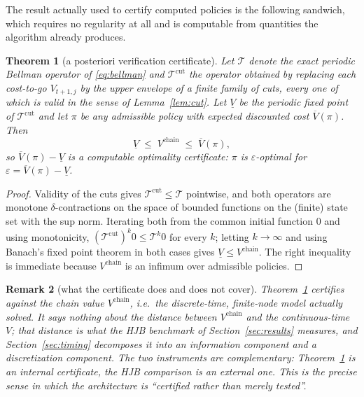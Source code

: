 \documentclass[pdflatex,sn-mathphys-num]{sn-jnl}
\theoremstyle{thmstyleone}
\newtheorem{theorem}{Theorem}[section]
\theoremstyle{thmstyletwo}
\newtheorem{remark}[theorem]{Remark}
\theoremstyle{thmstylethree}
\begin{document}
\begin{appendices}
The result actually used to certify computed policies is the following
sandwich, which requires no regularity at all and is computable from
quantities the algorithm already produces.

\begin{theorem}[a posteriori verification certificate]
\label{thm:posterior}
Let $\mathcal T$ denote the exact periodic Bellman operator of
\eqref{eq:bellman} and $\mathcal T^{\mathrm{cut}}$ the operator obtained by
replacing each cost-to-go $V_{t+1,j}$ by the upper envelope of a finite
family of cuts, every one of which is valid in the sense of
Lemma~\ref{lem:cut}. Let $\underline V$ be the periodic fixed point of
$\mathcal T^{\mathrm{cut}}$ and let $\pi$ be any admissible policy with
expected discounted cost $\overline V(\pi)$. Then
\[
\underline V \;\le\; V^{\mathrm{chain}} \;\le\; \overline V(\pi),
\]
so $\overline V(\pi)-\underline V$ is a computable optimality certificate:
$\pi$ is $\varepsilon$-optimal for $\varepsilon=\overline V(\pi)-\underline V$.
\end{theorem}

\begin{proof}
Validity of the cuts gives $\mathcal T^{\mathrm{cut}}\le\mathcal T$
pointwise, and both operators are monotone $\delta$-contractions on the
space of bounded functions on the (finite) state set with the sup norm.
Iterating both from the common initial function $0$ and using monotonicity,
$(\mathcal T^{\mathrm{cut}})^k 0\le \mathcal T^k 0$ for every $k$; letting
$k\to\infty$ and using Banach's fixed point theorem in both cases gives
$\underline V\le V^{\mathrm{chain}}$. The right inequality is immediate
because $V^{\mathrm{chain}}$ is an infimum over admissible policies.
\end{proof}

\begin{remark}[what the certificate does and does not cover]
\label{rem:certificate}
Theorem~\ref{thm:posterior} certifies against the \emph{chain} value
$V^{\mathrm{chain}}$, i.e.\ the discrete-time, finite-node model actually
solved. It says nothing about the distance between $V^{\mathrm{chain}}$ and
the continuous-time $V$; that distance is what the HJB benchmark of
Section~\ref{sec:results} measures, and
Section~\ref{sec:timing} decomposes it into an information component and a
discretization component. The two instruments are complementary:
Theorem~\ref{thm:posterior} is an internal certificate,
the HJB comparison is an external one. This is the precise sense in which
the architecture is ``certified rather than merely tested''.
\end{remark}


\end{appendices}
\end{document}
